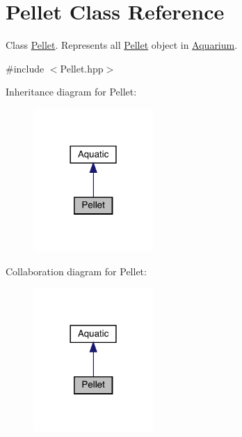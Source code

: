 \hypertarget{class_pellet}{}\section{Pellet Class Reference}
\label{class_pellet}


Class \mbox{\hyperlink{class_pellet}{Pellet}}. Represents all \mbox{\hyperlink{class_pellet}{Pellet}} object in \mbox{\hyperlink{class_aquarium}{Aquarium}}.  




{\ttfamily \#include $<$Pellet.\+hpp$>$}



Inheritance diagram for Pellet\+:\nopagebreak
\begin{figure}[H]
\begin{center}
\leavevmode
\includegraphics[width=129pt]{class_pellet__inherit__graph}
\end{center}
\end{figure}


Collaboration diagram for Pellet\+:\nopagebreak
\begin{figure}[H]
\begin{center}
\leavevmode
\includegraphics[width=129pt]{class_pellet__coll__graph}
\end{center}
\end{figure}
